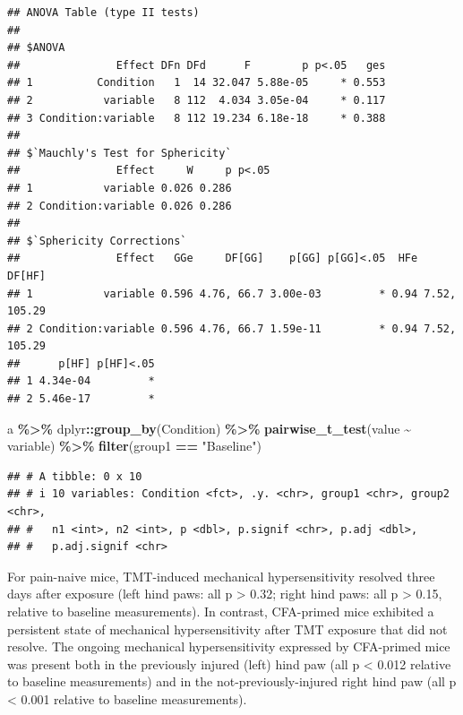\documentclass[
]{book}
\newenvironment{Shaded}{\begin{snugshade}}{\end{snugshade}}
\newcommand{\FunctionTok}[1]{\textcolor[rgb]{0.13,0.29,0.53}{\textbf{#1}}}
\newcommand{\NormalTok}[1]{#1}
\newcommand{\SpecialCharTok}[1]{\textcolor[rgb]{0.81,0.36,0.00}{\textbf{#1}}}
\newcommand{\StringTok}[1]{\textcolor[rgb]{0.31,0.60,0.02}{#1}}
\begin{document}
\begin{verbatim}
## ANOVA Table (type II tests)
## 
## $ANOVA
##               Effect DFn DFd      F        p p<.05   ges
## 1          Condition   1  14 32.047 5.88e-05     * 0.553
## 2           variable   8 112  4.034 3.05e-04     * 0.117
## 3 Condition:variable   8 112 19.234 6.18e-18     * 0.388
## 
## $`Mauchly's Test for Sphericity`
##               Effect     W     p p<.05
## 1           variable 0.026 0.286      
## 2 Condition:variable 0.026 0.286      
## 
## $`Sphericity Corrections`
##               Effect   GGe     DF[GG]    p[GG] p[GG]<.05  HFe       DF[HF]
## 1           variable 0.596 4.76, 66.7 3.00e-03         * 0.94 7.52, 105.29
## 2 Condition:variable 0.596 4.76, 66.7 1.59e-11         * 0.94 7.52, 105.29
##      p[HF] p[HF]<.05
## 1 4.34e-04         *
## 2 5.46e-17         *
\end{verbatim}

\begin{Shaded}
\begin{Highlighting}[]
\NormalTok{a }\SpecialCharTok{\%\textgreater{}\%}
\NormalTok{  dplyr}\SpecialCharTok{::}\FunctionTok{group\_by}\NormalTok{(Condition) }\SpecialCharTok{\%\textgreater{}\%}
  \FunctionTok{pairwise\_t\_test}\NormalTok{(value }\SpecialCharTok{\textasciitilde{}}\NormalTok{ variable) }\SpecialCharTok{\%\textgreater{}\%}
  \FunctionTok{filter}\NormalTok{(group1 }\SpecialCharTok{==} \StringTok{"Baseline"}\NormalTok{)}
\end{Highlighting}
\end{Shaded}

\begin{verbatim}
## # A tibble: 0 x 10
## # i 10 variables: Condition <fct>, .y. <chr>, group1 <chr>, group2 <chr>,
## #   n1 <int>, n2 <int>, p <dbl>, p.signif <chr>, p.adj <dbl>,
## #   p.adj.signif <chr>
\end{verbatim}

For pain-naive mice, TMT-induced mechanical hypersensitivity resolved three days after exposure (left hind paws: all p \textgreater{} 0.32; right hind paws: all p \textgreater{} 0.15, relative to baseline measurements). In contrast, CFA-primed mice exhibited a persistent state of mechanical hypersensitivity after TMT exposure that did not resolve. The ongoing mechanical hypersensitivity expressed by CFA-primed mice was present both in the previously injured (left) hind paw (all p \textless{} 0.012 relative to baseline measurements) and in the not-previously-injured right hind paw (all p \textless{} 0.001 relative to baseline measurements).
\end{document}
